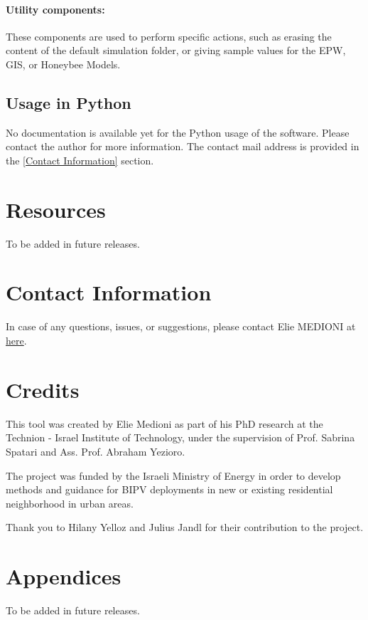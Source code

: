 \documentclass[a4paper,12pt]{article} %
\begin{document}
    \paragraph{Utility components:} These components are used to perform specific actions, such as erasing the content of the default simulation folder, or giving sample values for the EPW, GIS, or Honeybee Models.

    \subsection{Usage in Python}
    \label{subsec:usage-in-python}
    No documentation is available yet for the Python usage of the software.
    Please contact the author for more information.
    The contact mail address is provided in the \ref{Contact Information} section.




\section{Resources}
\label{sec:resources}
To be added in future releases.

\section{Contact Information}
\label{sec:Contact Information}
In case of any questions, issues, or suggestions, please contact Elie MEDIONI at \href{mailto:elie-medioni@campus.technion.ac.il}{here}.

\section{Credits}
\label{sec:Credits}

This tool was created by Elie Medioni as part of his PhD
research at the Technion - Israel Institute of Technology, under the
supervision of Prof. Sabrina Spatari and Ass. Prof. Abraham Yezioro.

The project was funded by the Israeli Ministry of Energy in order to develop methods and guidance for BIPV deployments
in new or existing residential neighborhood in urban areas.

Thank you to Hilany Yelloz and Julius Jandl for their contribution to the project.


\section{Appendices}
\label{sec:Appendices}
To be added in future releases.
\end{document}

